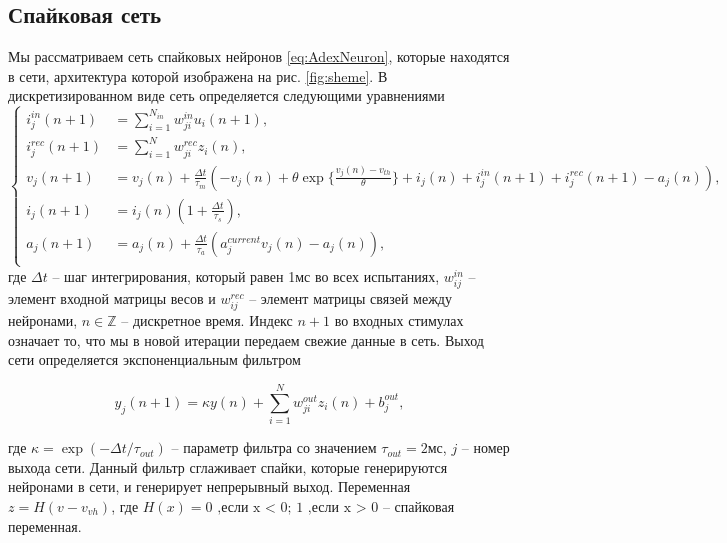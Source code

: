 \documentclass{article}
\begin{document}
\subsection{Спайковая сеть}
Мы рассматриваем сеть спайковых нейронов \ref{eq:AdexNeuron}, которые находятся в сети, архитектура которой изображена на рис. \ref{fig:sheme}. В дискретизированном виде сеть определяется следующими уравнениями
\begin{equation}\label{eq:Network}
  \begin{cases}
    i_j^{in}(n + 1)  & = \sum_{i=1}^{N_{in}} w^{in}_{ji}u_i(n + 1),                                                                                                           \\
    i_j^{rec}(n + 1) & = \sum_{i=1}^{N} w^{rec}_{ji}z_i(n),                                                                                                                   \\
    v_j(n + 1)       & = v_j(n) + \frac{\Delta t}{\tau_m}(-v_j(n) + \theta\exp{ \{\frac{v_j(n) - v_{th}}{\theta}\} } + i_j(n) + i_j^{in}(n + 1) + i_j^{rec}(n + 1) - a_j(n)), \\
    i_j(n + 1)       & = i_j(n)(1 + \frac{\Delta t}{\tau_s}),                                                                                                                 \\
    a_j(n + 1)       & = a_j(n) + \frac{\Delta t}{\tau_a}(a_j^{current}v_j(n) - a_j(n)),                                                                                      \\
  \end{cases}
\end{equation}
где $\Delta t$ -- шаг интегрирования, который равен 1мс во всех испытаниях, $w_{ij}^{in}$ -- элемент входной матрицы весов и $w_{ij}^{rec}$ -- элемент матрицы связей между нейронами, $n \in \mathbb{Z}$ -- дискретное время.  Индекс $n + 1$ во входных стимулах означает то, что мы в новой итерации передаем свежие данные в сеть. Выход сети определяется экспоненциальным фильтром

\begin{equation}\label{eq:y}
  y_j(n + 1) = \kappa y(n) + \sum_{i = 1}^N w^{out}_{ji}z_i(n) + b^{out}_j,
\end{equation}

где $\kappa = \exp{(-\Delta t / \tau_{out})}$ -- параметр фильтра со значением $\tau_{out} = 2\text{мс}$, $j$ -- номер выхода сети. Данный фильтр сглаживает спайки, которые генерируются нейронами в сети, и генерирует непрерывный выход. Переменная $z = H(v - v_{vh})$, где $H(x) = 0 \text{ ,если x < 0; } 1 \text{ ,если x > 0}$ -- спайковая переменная.
\end{document}
